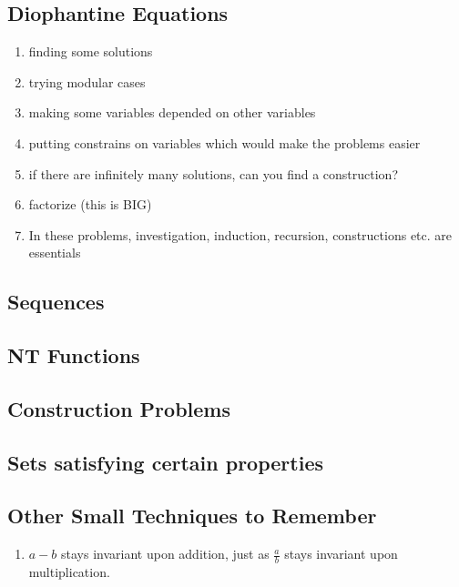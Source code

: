 	
	
	
	
	\Faka\subsection{Diophantine Equations}
	
	
		\begin{enumerate}
			
			\item finding some solutions
			\item trying modular cases
			\item making some variables depended on other variables
			\item putting constrains on variables which would make the problems easier
			\item if there are infinitely many solutions, can you find a construction?
			\item factorize (this is BIG)
			\item In these problems, investigation, induction, recursion, constructions etc. are essentials
			
		\end{enumerate}
	
	
	
	
	\Faka\subsection{Sequences}
	
	
	\Faka\subsection{NT Functions}
	
	
	\Faka\subsection{Construction Problems}
	
	
	\Faka\subsection{Sets satisfying certain properties}
	
	
	\Faka\subsection{Other Small Techniques to Remember}
	
	
		\begin{enumerate}
			\item $ a-b $ stays invariant upon addition, just as $ \frac{a}{b} $ stays invariant upon multiplication.
		\end{enumerate}
	
